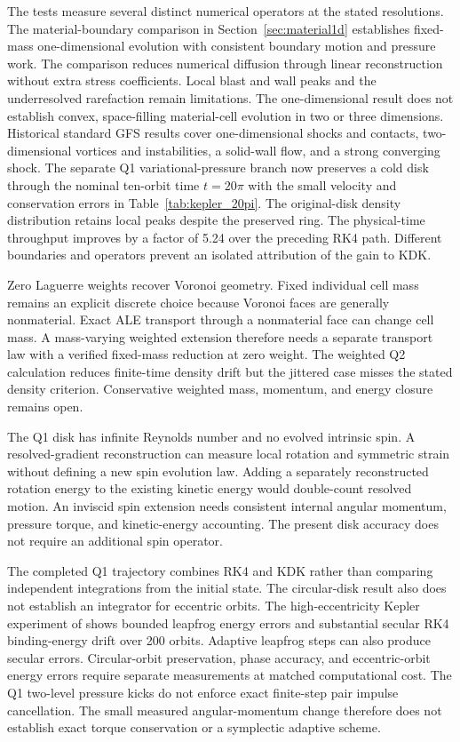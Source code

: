 \documentclass[twocolumn]{aastex63}
\begin{document}
The tests measure several distinct numerical operators at the stated
resolutions. The material-boundary comparison in
Section~\ref{sec:material1d} establishes fixed-mass one-dimensional evolution
with consistent boundary motion and pressure work. The comparison reduces
numerical diffusion through linear reconstruction without extra stress
coefficients. Local blast and wall peaks and the underresolved rarefaction
remain limitations. The one-dimensional result does not establish convex,
space-filling material-cell evolution in two or three dimensions.
Historical standard GFS results cover one-dimensional shocks and contacts,
two-dimensional vortices and instabilities, a solid-wall flow, and a strong
converging shock. The separate Q1 variational-pressure branch now preserves
a cold disk through the nominal ten-orbit time $t=20\pi$ with the small
velocity and conservation errors in Table~\ref{tab:kepler_20pi}.
The original-disk density distribution retains local peaks despite the
preserved ring. The physical-time throughput improves by a factor of 5.24
over the preceding RK4 path. Different boundaries and operators prevent
an isolated attribution of the gain to KDK.

Zero Laguerre weights recover Voronoi geometry. Fixed individual cell mass
remains an explicit discrete choice because Voronoi faces are generally
nonmaterial. Exact ALE transport through a nonmaterial face can change
cell mass. A mass-varying weighted extension therefore needs a separate
transport law with a verified fixed-mass reduction at zero weight.
The weighted Q2 calculation reduces finite-time density drift but the
jittered case misses the stated density criterion.
Conservative weighted mass, momentum, and energy closure remains open.

The Q1 disk has infinite Reynolds number and no evolved intrinsic spin.
A resolved-gradient reconstruction can measure local rotation and symmetric
strain without defining a new spin evolution law. Adding a separately
reconstructed rotation energy to the existing kinetic energy would
double-count resolved motion. An inviscid spin extension needs consistent
internal angular momentum, pressure torque, and kinetic-energy accounting.
The present disk accuracy does not require an additional spin operator.

The completed Q1 trajectory combines RK4 and KDK rather than comparing
independent integrations from the initial state. The circular-disk result
also does not establish an integrator for eccentric orbits.
The high-eccentricity Kepler experiment of \citet{Springel2005} shows bounded
leapfrog energy errors and substantial secular RK4 binding-energy drift
over 200 orbits. Adaptive leapfrog steps can also produce secular errors.
Circular-orbit preservation, phase accuracy, and eccentric-orbit energy
errors require separate measurements at matched computational cost.
The Q1 two-level pressure kicks do not enforce exact finite-step pair
impulse cancellation. The small measured angular-momentum change therefore
does not establish exact torque conservation or a symplectic adaptive scheme.
\end{document}
